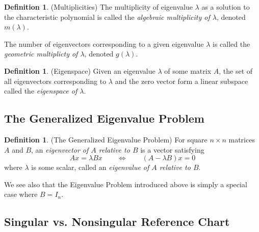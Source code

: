 \documentclass[12pt]{article}
\theoremstyle{plain}
\theoremstyle{definition}
\newtheorem{defn}[thm]{Definition}
\theoremstyle{remark}
\begin{document}
\begin{defn}{(Multiplicities)}
The multiplicity of eigenvalue $\lambda$ as a solution to the
characteristic polynomial is called the \emph{algebraic multiplicity of
$\lambda$}, denoted $m(\lambda)$.

The number of eigenvectors corresponding to a given eigenvalue $\lambda$
is called the \emph{geometric multiplicty of $\lambda$}, denoted
$g(\lambda)$.
\end{defn}

\begin{defn}{(Eigenspace)}
Given an eigenvalue $\lambda$ of some matrix $A$, the set of all
eigenvectors corresponding to $\lambda$ and the zero vector form a
linear subspace called the \emph{eigenspace of $\lambda$}.
\end{defn}

\subsection{The Generalized Eigenvalue Problem}

\begin{defn}{(The Generalized Eigenvalue Problem)}
For square $n\times n$ matrices $A$ and $B$, an \emph{eigenvector of
$A$ relative to $B$} is a vector satisfying
\begin{equation}
  Ax = \lambda B x
  \qquad \Leftrightarrow \qquad
  (A - \lambda B) x = 0
\end{equation}
where $\lambda$ is some scalar, called an \emph{eigenvalue of $A$
relative to $B$}.

We see also that the Eigenvalue Problem introduced above is simply a
special case where $B=I_n$.
\end{defn}

\subsection{Singular vs. Nonsingular Reference Chart}
\end{document}
